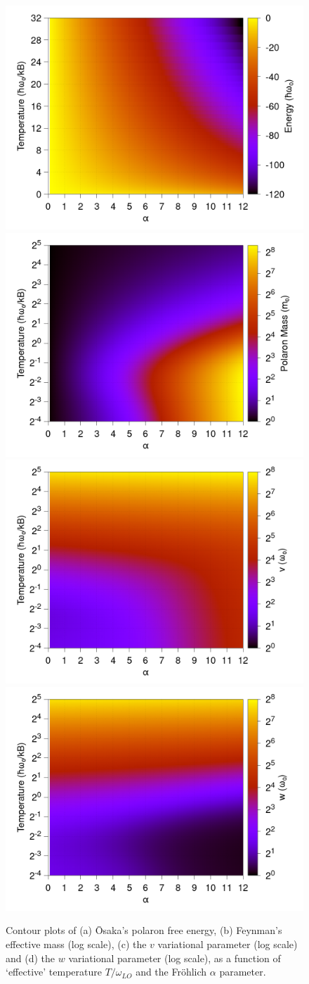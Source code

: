 \begin{figure}[t]
    \centering
    \includegraphics[width = .49\textwidth]{figures/frohlich-3d-energy-temp-00625to32-contourf.png}
    \includegraphics[width = .49\textwidth]{figures/frohlich-3d-mass-temp-00625to32-contourf.png}
    \includegraphics[width = .49\textwidth]{figures/frohlich-3d-v-temp-00625to32-contourf.png}
    \includegraphics[width = .49\textwidth]{figures/frohlich-3d-w-temp-00625to32-contourf.png}
    \caption{Contour plots of (a) \=Osaka's polaron free energy, (b) Feynman's effective mass (log scale), (c) the $v$ variational parameter (log scale) and (d) the $w$ variational parameter (log scale), as a function of `effective' temperature $T / \omega_{LO}$ and the Fr\"ohlich $\alpha$ parameter.}
    \label{fig:thermaltheory}
\end{figure}

